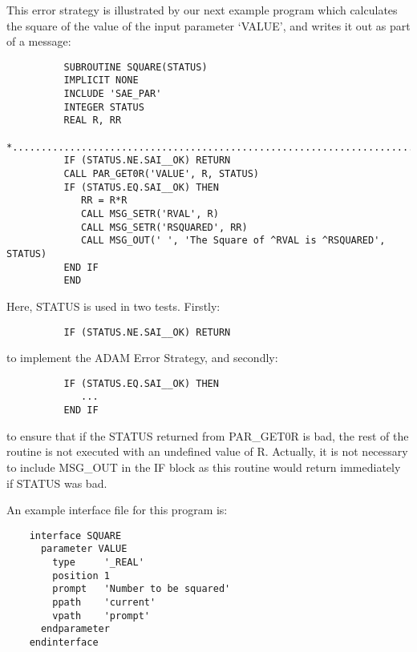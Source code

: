 This error strategy is illustrated by our next example program which calculates
the square of the value of the input parameter `VALUE', and writes it out as
part of a message:

\begin{small}
\begin{verbatim}
          SUBROUTINE SQUARE(STATUS)
          IMPLICIT NONE
          INCLUDE 'SAE_PAR'
          INTEGER STATUS
          REAL R, RR
    *...........................................................................
          IF (STATUS.NE.SAI__OK) RETURN
          CALL PAR_GET0R('VALUE', R, STATUS)
          IF (STATUS.EQ.SAI__OK) THEN
             RR = R*R
             CALL MSG_SETR('RVAL', R)
             CALL MSG_SETR('RSQUARED', RR)
             CALL MSG_OUT(' ', 'The Square of ^RVAL is ^RSQUARED', STATUS)
          END IF
          END
\end{verbatim}
\end{small}

Here, STATUS is used in two tests.
Firstly:

\begin{small}
\begin{verbatim}
          IF (STATUS.NE.SAI__OK) RETURN
\end{verbatim}
\end{small}

to implement the ADAM Error Strategy, and secondly:

\begin{small}
\begin{verbatim}
          IF (STATUS.EQ.SAI__OK) THEN
             ...
          END IF
\end{verbatim}
\end{small}

to ensure that if the STATUS returned from PAR\_GET0R is bad, the rest of the
routine is not executed with an undefined value of R.
Actually, it is not necessary to include MSG\_OUT in the IF block as this
routine would return immediately if STATUS was bad.

An example interface file for this program is:

\begin{small}
\begin{verbatim}
    interface SQUARE
      parameter VALUE
        type     '_REAL'
        position 1
        prompt   'Number to be squared'
        ppath    'current'
        vpath    'prompt'
      endparameter
    endinterface
\end{verbatim}
\end{small}

